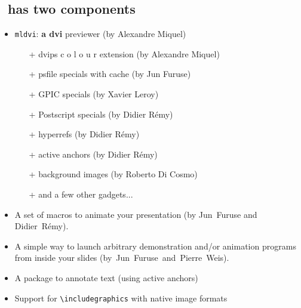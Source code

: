 \documentclass[12pt]{article}
\begin{document}
\newpage


\subsection* {\ActiveDVI~has two components}

\begin{itemize}
\item {\tt mldvi}: {\bf a dvi} previewer (by Alexandre Miquel)
\begin {itemize}
\item[+] dvips
  \textcolor{c1}{c}%
  \textcolor{c2}{o}%
  \textcolor{c3}{l}%
  \textcolor{c4}{o}%
  \textcolor{c5}{u}%
  \textcolor{c6}{r}
  extension (by Alexandre Miquel)
\item[+] psfile specials with cache (by Jun Furuse)
\item[+] GPIC specials (by Xavier Leroy)
\item[+] Postscript specials (by Didier R{\'{e}}my)
\item[+] hyperrefs (by Didier R{\'{e}}my)
\item[+] active anchors (by Didier R{\'{e}}my)
\item[+] background images (by Roberto Di Cosmo)
\item[+] and a few other gadgets...
\end {itemize}
\end{itemize}

\begin{itemize}
\item 
A set of macros to animate your presentation 
(by Jun~Furuse and Didier~R{\'{e}}my).
 
\item 
A simple way to launch arbitrary demonstration and/or animation
programs from inside your slides
\hbox {(by Jun Furuse and Pierre Weis)}.

\item 
A package to annotate text (using active anchors)

\item
Support for \verb+\includegraphics+ with native image formats

\end{itemize}

\newpage

\def \flash #1{\let \do\leflash \do #1\relax}
\def \leflash #1{\ifx #1\relax \def \do{}\else \def \do {#1\adviwait[0.05]\leflash}\fi \do}

\def\goon{\hbox{{\Large $\Rightarrow$}~Type~space~to~go~on}}
\end{document}
